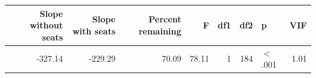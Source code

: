 \begingroup\footnotesize
\begin{tabular}{rrrrrrlr}
  \toprule
Slope without seats & Slope with seats & Percent remaining & F & df1 & df2 & p & VIF \\ 
  \midrule
-327.14 & -229.29 & 70.09 & 78.11 &   1 & 184 & $<$.001 & 1.01 \\ 
   \bottomrule
\end{tabular}
\endgroup

